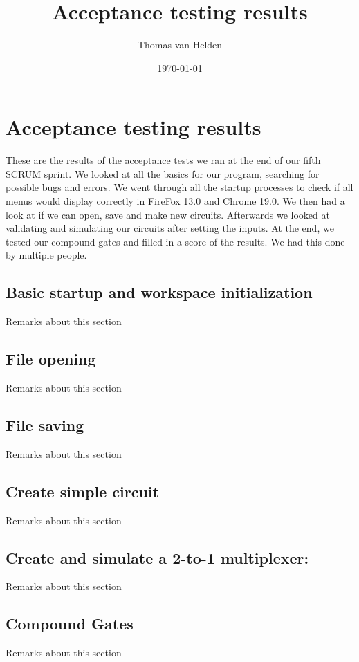 \documentclass[a4paper]{article}
\begin{document}
\title{Acceptance testing results}
\author{Thomas van Helden}
\date{\today}
\maketitle



\section{Acceptance testing results}
These are the results of the acceptance tests we ran at the end of our fifth SCRUM sprint. We looked at all the basics for our program, searching for possible bugs and errors. We went through all the startup processes to check if all menus would display correctly in FireFox 13.0 and Chrome 19.0. We then had a look at if we can open, save and make new circuits. Afterwards we looked at validating and simulating our circuits after setting the inputs. At the end, we tested our compound gates and filled in a score of the results. We had this done by multiple people.

\subsection{Basic startup and workspace initialization}
Remarks about this section

\subsection{File opening}
Remarks about this section

\subsection{File saving}
Remarks about this section

\subsection{Create simple circuit}
Remarks about this section

\subsection{Create and simulate a 2-to-1 multiplexer:}
Remarks about this section

\subsection{Compound Gates}
Remarks about this section
\end{document}
